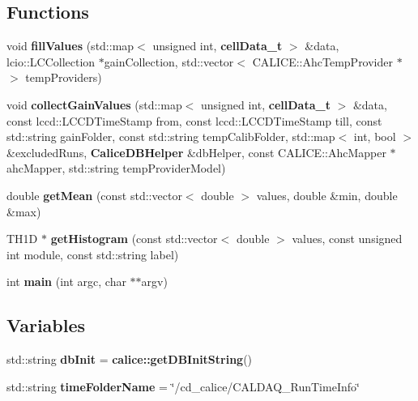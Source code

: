 \subsection*{Functions}
\begin{DoxyCompactItemize}
\item 
void {\bfseries fill\-Values} (std\-::map$<$ unsigned int, {\bf cell\-Data\-\_\-t} $>$ \&data, lcio\-::\-L\-C\-Collection $\ast$gain\-Collection, std\-::vector$<$ C\-A\-L\-I\-C\-E\-::\-Ahc\-Temp\-Provider $\ast$ $>$ temp\-Providers)\label{extractGainVsTemp_8cc_a1ac5935dd79bf264db3a460c79b3b05a}

\item 
void {\bfseries collect\-Gain\-Values} (std\-::map$<$ unsigned int, {\bf cell\-Data\-\_\-t} $>$ \&data, const lccd\-::\-L\-C\-C\-D\-Time\-Stamp from, const lccd\-::\-L\-C\-C\-D\-Time\-Stamp till, const std\-::string gain\-Folder, const std\-::string temp\-Calib\-Folder, std\-::map$<$ int, bool $>$ \&excluded\-Runs, {\bf Calice\-D\-B\-Helper} \&db\-Helper, const C\-A\-L\-I\-C\-E\-::\-Ahc\-Mapper $\ast$ahc\-Mapper, std\-::string temp\-Provider\-Model)\label{extractGainVsTemp_8cc_a43922251ebb7273c8d4d86d26f402805}

\item 
double {\bfseries get\-Mean} (const std\-::vector$<$ double $>$ values, double \&min, double \&max)\label{extractGainVsTemp_8cc_afaa7d8373bf0feb2a1f23ac6ad09506b}

\item 
T\-H1\-D $\ast$ {\bfseries get\-Histogram} (const std\-::vector$<$ double $>$ values, const unsigned int module, const std\-::string label)\label{extractGainVsTemp_8cc_aeee70b8a9261aacc2e9bcd99b411eed6}

\item 
int {\bfseries main} (int argc, char $\ast$$\ast$argv)\label{extractGainVsTemp_8cc_a3c04138a5bfe5d72780bb7e82a18e627}

\end{DoxyCompactItemize}
\subsection*{Variables}
\begin{DoxyCompactItemize}
\item 
std\-::string {\bfseries db\-Init} = {\bf calice\-::get\-D\-B\-Init\-String}()\label{extractGainVsTemp_8cc_a6b6249ff0366b8a48c34dfbbf6c6fbec}

\item 
std\-::string {\bfseries time\-Folder\-Name} = \char`\"{}/cd\-\_\-calice/C\-A\-L\-D\-A\-Q\-\_\-\-Run\-Time\-Info\char`\"{}\label{extractGainVsTemp_8cc_a4d2cd635f803f7649a78988cdd8b70b9}

\end{DoxyCompactItemize}


